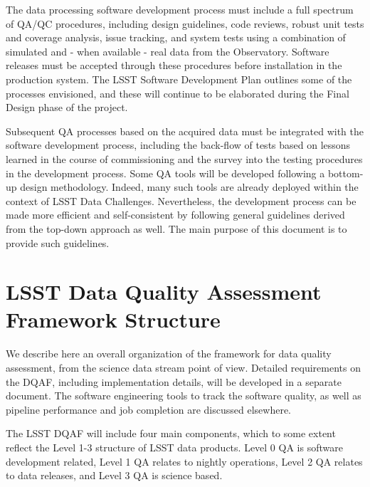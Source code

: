 \documentclass[SE,toc,lsstdraft]{lsstdoc}
\begin{document}
The data processing software development process must include a full spectrum of QA/QC procedures, including design guidelines, code reviews, robust unit tests and coverage analysis, issue tracking, and system tests using a combination of simulated and - when available - real data from the Observatory.  Software releases must be accepted through these procedures before installation in the production system. The LSST Software Development Plan outlines some of the processes envisioned, and these will continue to be elaborated during the Final Design phase of the project.

Subsequent QA processes based on the acquired data must be integrated with the software development process, including the back-flow of tests based on lessons learned in the course of commissioning and the survey into the testing procedures in the development process.
Some QA tools will be developed following a bottom-up design methodology. Indeed,
many such tools are already deployed within the context of LSST Data Challenges.
Nevertheless, the development process can be made more efficient and self-consistent
by following general guidelines derived from the top-down approach as well. The main purpose of
this document is to provide such guidelines.


\section{LSST Data Quality Assessment Framework Structure}

We describe here an overall organization of the framework for data quality assessment, from the science data stream point of view.  Detailed requirements on the DQAF, including implementation details, will be developed in a separate document.
The software engineering tools to track the software quality, as well as
pipeline performance and job completion are discussed elsewhere.

The LSST DQAF will include four main components, which to some extent reflect
the Level 1-3 structure of LSST data products.  Level 0 QA is software development related, Level 1 QA relates to nightly operations, Level 2 QA relates to data releases, and Level 3 QA is science based.
\end{document}
